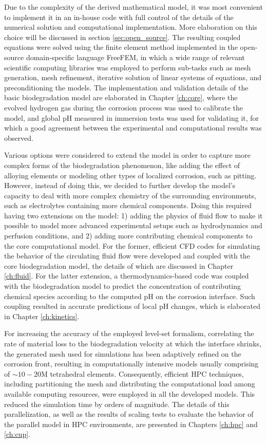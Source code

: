 Due to the complexity of the derived mathematical model, it was most convenient to implement it in an in-house code with full control of the details of the numerical solution and computational implementation. More elaboration on this choice will be discussed in section \ref{sec:open_source}. The resulting coupled equations were solved using the finite element method implemented in the open-source domain-specific language FreeFEM, in which a wide range of relevant scientific computing libraries was employed to perform sub-tasks such as mesh generation, mesh refinement, iterative solution of linear systems of equations, and preconditioning the models. The implementation and validation details of the basic biodegradation model are elaborated in Chapter \ref{ch:core}, where the evolved hydrogen gas during the corrosion process was used to calibrate the model, and global pH measured in immersion tests was used for validating it, for which a good agreement between the experimental and computational results was observed.

Various options were considered to extend the model in order to capture more complex forms of the biodegradation phenomenon, like adding the effect of alloying elements or modeling other types of localized corrosion, such as pitting. However, instead of doing this, we decided to further develop the model’s capacity to deal with more complex chemistry of the surrounding environments, such as electrolytes containing more chemical components. Doing this required having two extensions on the model: 1) adding the physics of fluid flow to make it possible to model more advanced experimental setups such as hydrodynamics and perfusion conditions, and 2) adding more contributing chemical components to the core computational model. For the former, efficient \gls{CFD} codes for simulating the behavior of the circulating fluid flow were developed and coupled with the core biodegradation model, the details of which are discussed in Chapter \ref{ch:fluid}. For the latter extension, a thermodynamics-based code was coupled with the biodegradation model to predict the concentration of contributing chemical species according to the computed pH on the corrosion interface. Such coupling resulted in accurate predictions of local pH changes, which is elaborated in Chapter \ref{ch:kinetics}.

For increasing the accuracy of the employed level-set formalism, correlating the rate of material loss to the biodegradation velocity at which the interface shrinks, the generated mesh used for simulations has been adaptively refined on the corrosion front, resulting in computationally intensive models usually comprising of $\sim10-20\text{M}$ tetrahedral elements. Consequently, efficient \gls{HPC} techniques, including partitioning the mesh and distributing the computational load among available computing resources, were employed in all the developed models. This reduced the simulation time by orders of magnitude. The details of this parallelization, as well as the results of scaling tests to evaluate the behavior of the parallel model in \gls{HPC} environments, are presented in Chapters \ref{ch:hpc} and \ref{ch:cup}.

